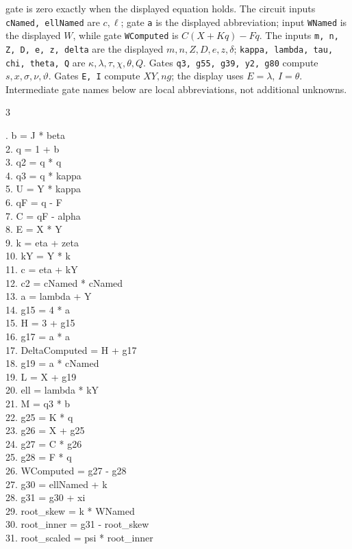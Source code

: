 \documentclass[10pt]{article}
\begin{document}
gate is zero exactly when the displayed equation holds. The circuit inputs
\texttt{cNamed, ellNamed} are $c,\ell$; gate \texttt{a} is the displayed abbreviation; input \texttt{WNamed} is the
displayed $W$, while gate \texttt{WComputed} is $C(X+Kq)-Fq$. The inputs
\texttt{m, n, Z, D, e, z, delta} are the displayed
$m,n,Z,D,e,z,\delta$; \texttt{kappa, lambda, tau, chi, theta, Q}
are $\kappa,\lambda,\tau,\chi,\theta,Q$. Gates \texttt{q3, g55, g39, y2, g80} compute $s,x,\sigma,\nu,\vartheta$. Gates \texttt{E, I} compute
$XY,ng$; the display uses $E=\lambda$, $I=\theta$. Intermediate gate
names below are local abbreviations, not additional unknowns.
\begin{multicols}{3}
\raggedright\ttfamily\fontsize{7.2}{8.4}. b = J * beta\\
2. q = 1 + b\\
3. q2 = q * q\\
4. q3 = q * kappa\\
5. U = Y * kappa\\
6. qF = q - F\\
7. C = qF - alpha\\
8. E = X * Y\\
9. k = eta + zeta\\
10. kY = Y * k\\
11. c = eta + kY\\
12. c2 = cNamed * cNamed\\
13. a = lambda + Y\\
14. g15 = 4 * a\\
15. H = 3 + g15\\
16. g17 = a * a\\
17. DeltaComputed = H + g17\\
18. g19 = a * cNamed\\
19. L = X + g19\\
20. ell = lambda * kY\\
21. M = q3 * b\\
22. g25 = K * q\\
23. g26 = X + g25\\
24. g27 = C * g26\\
25. g28 = F * q\\
26. WComputed = g27 - g28\\
27. g30 = ellNamed + k\\
28. g31 = g30 + xi\\
29. root\_skew = k * WNamed\\
30. root\_inner = g31 - root\_skew\\
31. root\_scaled = psi * root\_inner\\

\end{multicols}
\end{document}
